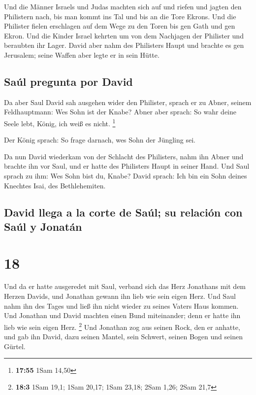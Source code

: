 Und die Männer Israels und Judas machten sich auf und
riefen und jagten den Philistern nach, bis man kommt ins Tal und bis an
die Tore Ekrons. Und die Philister fielen erschlagen auf dem Wege zu den
Toren bis gen Gath und gen Ekron.  Und die Kinder Israel
kehrten um von dem Nachjagen der Philister und beraubten ihr Lager.
 David aber nahm des Philisters Haupt und brachte es gen
Jerusalem; seine Waffen aber legte er in sein Hütte.

\hypertarget{sauxfal-pregunta-por-david}{%
\subsection{Saúl pregunta por David}\label{sauxfal-pregunta-por-david}}

 Da aber Saul David sah ausgehen wider den Philister,
sprach er zu Abner, seinem Feldhauptmann: Wes Sohn ist der Knabe? Abner
aber sprach: So wahr deine Seele lebt, König, ich weiß es nicht.
\footnote{\textbf{17:55} 1Sam 14,50}

 Der König sprach: So frage darnach, wes Sohn der
Jüngling sei.

 Da nun David wiederkam von der Schlacht des Philisters,
nahm ihn Abner und brachte ihn vor Saul, und er hatte des Philisters
Haupt in seiner Hand.  Und Saul sprach zu ihm: Wes Sohn
bist du, Knabe? David sprach: Ich bin ein Sohn deines Knechtes Isai, des
Bethlehemiten.

\hypertarget{david-llega-a-la-corte-de-sauxfal-su-relaciuxf3n-con-sauxfal-y-jonatuxe1n}{%
\subsection{David llega a la corte de Saúl; su relación con Saúl y
Jonatán}\label{david-llega-a-la-corte-de-sauxfal-su-relaciuxf3n-con-sauxfal-y-jonatuxe1n}}

\hypertarget{section-17}{%
\section{18}\label{section-17}}

 Und da er hatte ausgeredet mit Saul, verband sich das
Herz Jonathans mit dem Herzen Davids, und Jonathan gewann ihn lieb wie
sein eigen Herz.  Und Saul nahm ihn des Tages und ließ ihn
nicht wieder zu seines Vaters Haus kommen.  Und Jonathan
und David machten einen Bund miteinander; denn er hatte ihn lieb wie
sein eigen Herz. \footnote{\textbf{18:3} 1Sam 19,1; 1Sam 20,17; 1Sam
  23,18; 2Sam 1,26; 2Sam 21,7}  Und Jonathan zog aus
seinen Rock, den er anhatte, und gab ihn David, dazu seinen Mantel, sein
Schwert, seinen Bogen und seinen Gürtel.

